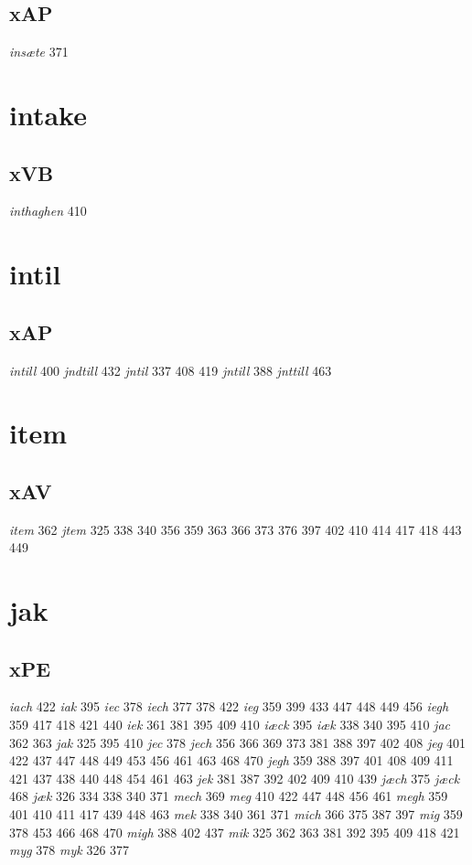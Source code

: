 \documentclass[a4paper,twocolumn]{article}
\begin{document}
\subsection{xAP}
\label{sec:orgb68f836}
\emph{insæte} 371 
\section{intake}
\label{sec:org1c2e530}
\subsection{xVB}
\label{sec:org902966e}
\emph{inthaghen} 410 
\section{intil}
\label{sec:orgcb63962}
\subsection{xAP}
\label{sec:orga5b700c}
\emph{intill} 400 \emph{jndtill} 432 \emph{jntil} 337 408 419 \emph{jntill} 388 \emph{jnttill} 463 
\section{item}
\label{sec:org2baa27c}
\subsection{xAV}
\label{sec:orgc3968b3}
\emph{item} 362 \emph{jtem} 325 338 340 356 359 363 366 373 376 397 402 410 414 417 418 443 449 
\section{jak}
\label{sec:orga9bc470}
\subsection{xPE}
\label{sec:orgaf1564f}
\emph{iach} 422 \emph{iak} 395 \emph{iec} 378 \emph{iech} 377 378 422 \emph{ieg} 359 399 433 447 448 449 456 \emph{iegh} 359 417 418 421 440 \emph{iek} 361 381 395 409 410 \emph{iæck} 395 \emph{iæk} 338 340 395 410 \emph{jac} 362 363 \emph{jak} 325 395 410 \emph{jec} 378 \emph{jech} 356 366 369 373 381 388 397 402 408 \emph{jeg} 401 422 437 447 448 449 453 456 461 463 468 470 \emph{jegh} 359 388 397 401 408 409 411 421 437 438 440 448 454 461 463 \emph{jek} 381 387 392 402 409 410 439 \emph{jæch} 375 \emph{jæck} 468 \emph{jæk} 326 334 338 340 371 \emph{mech} 369 \emph{meg} 410 422 447 448 456 461 \emph{megh} 359 401 410 411 417 439 448 463 \emph{mek} 338 340 361 371 \emph{mich} 366 375 387 397 \emph{mig} 359 378 453 466 468 470 \emph{migh} 388 402 437 \emph{mik} 325 362 363 381 392 395 409 418 421 \emph{myg} 378 \emph{myk} 326 377 
\end{document}
